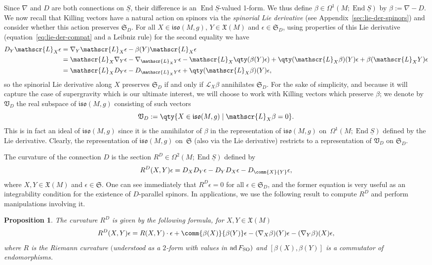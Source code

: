 \documentclass[10pt,a4paper]{amsart}
\numberwithin{equation}{section}
\newtheorem{Proposition}[Theorem]{Proposition}
 { \theoremstyle{definition}
\newtheorem{Definition}[Theorem]{Definition}
\newtheorem{Note}[Theorem]{Note}
\newtheorem{Example}[Theorem]{Example}
\newtheorem{Remark}[Theorem]{Remark} }
\newcommand{\fiso}{\mathfrak{iso}}
\newcommand{\fX}{\mathfrak{X}}
\newcommand{\fS}{\mathfrak{S}}
\newcommand{\fV}{\mathfrak{V}}
\newcommand{\eL}{\mathscr{L}}
\newcommand{\Sbundle}{\underline{S}}
\newcommand{\1}{\mathbbm{1}}
\DeclareMathOperator{\End}{End}
\DeclareMathOperator{\ad}{ad}
\begin{document}
Since $\nabla$ and $D$ are both connections on $\Sbundle$, their difference is an $\End\Sbundle$-valued 1-form. We thus define $\beta\in\Omega^1(M;\End\Sbundle)$ by $\beta := \nabla - D$. We now recall that Killing vectors have a natural action on spinors via the \emph{spinorial Lie derivative} (see Appendix~\ref{sec:lie-der-spinors}) and consider whether this action preserves $\fS_D$. For all $X\in\fiso(M,g)$, $Y\in\fX(M)$ and $\epsilon\in\fS_D$, using properties of this Lie derivative (equation~\eqref{eq:lie-der-compat} and a Leibniz rule) for the second equality we have
\begin{align*}
	D_Y\eL_X \epsilon
	&= \nabla_Y\eL_X\epsilon -\beta(Y)\eL_X\epsilon\\
&= \eL_X\nabla_Y\epsilon -\nabla_{\eL_X Y}\epsilon -\eL_X\qty(\beta(Y)\epsilon) +\qty(\eL_X\beta)(Y)\epsilon +\beta(\eL_XY)\epsilon\\
	&= \eL_X D_Y\epsilon - D_{\eL_X Y}\epsilon +\qty(\eL_X\beta)(Y)\epsilon,
\end{align*}
so the spinorial Lie derivative along $X$ preserves $\fS_D$ if and only if $\eL_X\beta$ annihilates $\fS_D$. For the sake of simplicity, and because it will capture the case of supergravity which is our ultimate interest, we will choose to work with Killing vectors which preserve $\beta$; we denote by $\fV_D$ the real subspace of $\fiso(M,g)$ consisting of such vectors
\[
\fV_D := \qty{X\in\fiso(M,g)\mid \eL_X \beta = 0}.
\]
This is in fact an ideal of $\fiso(M,g)$ since it is the annihilator of $\beta$ in the representation of $\fiso(M,g)$ on~$\Omega^1(M;\End\Sbundle)$ defined by the Lie derivative. Clearly, the representation of $\fiso(M,g)$ on~$\fS$ (also via the Lie derivative) restricts to a representation of $\fV_D$ on $\fS_D$.

The curvature of the connection $D$ is the section $R^D \in \Omega^2(M;\End\Sbundle)$ defined by
\begin{gather}\label{eq:D-curvature-def}
	R^D(X,Y)\epsilon = D_XD_Y\epsilon - D_YD_X\epsilon - D_{\comm{X}{Y}}\epsilon,
\end{gather}
where $X,Y\in\fX(M)$ and $\epsilon\in\fS$. One can see immediately that $R^D\epsilon=0$ for all $\epsilon\in\fS_D$, and the former equation is very useful as an integrability condition for the existence of $D$-parallel spinors. In applications, we use the following result to compute $R^D$ and perform manipulations involving it.

\begin{Proposition}\label{prop:D-curvature}
	The curvature $R^D$ is given by the following formula, for $X,Y\in\fX(M)$
	\begin{equation}\label{eq:D-curvature-formula}
		R^D(X,Y)\epsilon = R(X,Y)\cdot\epsilon + \comm{\beta(X)}{\beta(Y)}\epsilon - (\nabla_X\beta)(Y)\epsilon - (\nabla_Y\beta)(X)\epsilon,
	\end{equation}
	where $R$ is the Riemann curvature $($understood as a $2$-form with values in $\ad F_{\rm SO})$ and $[\beta(X),\allowbreak\beta(Y)]$ is a commutator of endomorphisms.
\end{Proposition}
\end{document}
